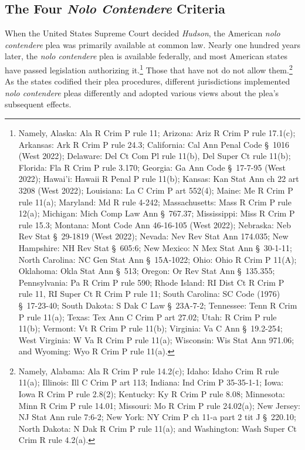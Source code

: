 \subsection{The Four \textit{Nolo Contendere} Criteria}

When the United States Supreme Court decided \textit{Hudson}, the American \textit{nolo contendere} plea was primarily available at common law. Nearly one hundred years later, the \textit{nolo contendere} plea is available federally, and most American states have passed legislation authorizing it.\footnote{Namely, Alaska: Ala R Crim P rule 11; Arizona: Ariz R Crim P rule 17.1(c); Arkansas: Ark R Crim P rule 24.3; California: Cal Ann Penal Code § 1016 (West 2022); Delaware: Del Ct Com Pl rule 11(b), Del Super Ct rule 11(b); Florida: Fla R Crim P rule 3.170; Georgia: Ga Ann Code § 17-7-95 (West 2022); Hawai'i: Hawaii R Penal P rule 11(b); Kansas: Kan Stat Ann ch 22 art 3208 (West 2022); Louisiana: La C Crim P art 552(4); Maine: Me R Crim P rule 11(a); Maryland: Md R rule 4-242; Massachusetts: Mass R Crim P rule 12(a); Michigan: Mich Comp Law Ann § 767.37; Mississippi: Miss R Crim P rule 15.3; Montana: Mont Code Ann 46-16-105 (West 2022); Nebraska: Neb Rev Stat § 29-1819 (West 2022); Nevada: Nev Rev Stat Ann 174.035; New Hampshire: NH Rev Stat § 605:6; New Mexico: N Mex Stat Ann § 30-1-11; North Carolina: NC Gen Stat Ann § 15A-1022; Ohio: Ohio R Crim P 11(A); Oklahoma: Okla Stat Ann § 513; Oregon: Or Rev Stat Ann § 135.355; Pennsylvania: Pa R Crim P rule 590; Rhode Island: RI Dist Ct R Crim P rule 11, RI Super Ct R Crim P rule 11; South Carolina: SC Code (1976) § 17-23-40; South Dakota: S Dak C Law § 23A-7-2; Tennessee: Tenn R Crim P rule 11(a); Texas: Tex Ann C Crim P art 27.02; Utah: R Crim P rule 11(b); Vermont: Vt R Crim P rule 11(b); Virginia: Va C Ann § 19.2-254; West Virginia: W Va R Crim P rule 11(a); Wisconsin: Wis Stat Ann 971.06; and Wyoming: Wyo R Crim P rule 11(a).} Those that have not do not allow them.\footnote{Namely, Alabama: Ala R Crim P rule 14.2(c); Idaho: Idaho Crim R rule 11(a); Illinois: Ill C Crim P art 113; Indiana: Ind Crim P 35-35-1-1; Iowa: Iowa R Crim P rule 2.8(2); Kentucky: Ky R Crim P rule 8.08; Minnesota: Minn R Crim P rule 14.01; Missouri: Mo R Crim P rule 24.02(a); New Jersey: NJ Stat Ann rule 7:6-2; New York: NY Crim P ch 11-a part 2 tit J § 220.10; North Dakota: N Dak R Crim P rule 11(a); and Washington: Wash Super Ct Crim R rule 4.2(a).} As the states codified their plea procedures, different jurisdictions implemented \textit{nolo contendere} pleas differently and adopted various views about the plea's subsequent effects.

